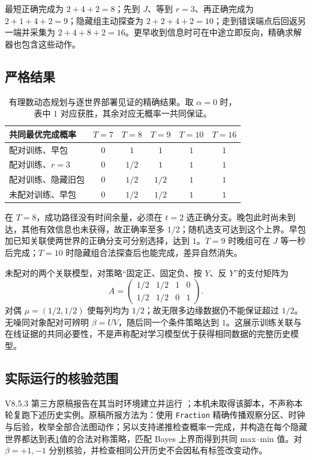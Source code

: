 \documentclass[11pt,a4paper,fontset=fandol]{ctexart}
\theoremstyle{definition}
\theoremstyle{remark}\newtheorem{remark}[theorem]{说明}
\numberwithin{equation}{section}
\begin{document}
最短正确完成为 $2+4+2=8$；先到 $J$、等到 $r=3$、再正确完成为 $2+1+4+2=9$；隐藏组主动探查为 $2+2+4+2=10$；走到错误端点后回返另一端并采集为 $2+4+8+2=16$。更早收到信息时可在中途立即反向，精确求解器也包含这些动作。

\subsection{严格结果}
\begin{table}[htbp]\centering\small
\begin{tabular}{lccccc}\toprule
共同最优完成概率 & $T=7$ & $T=8$ & $T=9$ & $T=10$ & $T=16$\\\midrule
配对训练、早包 & $0$ & $1$ & $1$ & $1$ & $1$\\
配对训练、$r=3$ & $0$ & $1/2$ & $1$ & $1$ & $1$\\
配对训练、隐藏旧包 & $0$ & $1/2$ & $1/2$ & $1$ & $1$\\
未配对训练、早包 & $0$ & $1/2$ & $1/2$ & $1$ & $1$\\\bottomrule
\end{tabular}
\caption{有理数动态规划与逐世界部署见证的精确结果。取 $\alpha=0$ 时，表中 $1$ 对应获胜，其余对应无概率一共同保证。}
\label{tab:graph}
\end{table}
在 $T=8$，成功路径没有时间余量，必须在 $t=2$ 选正确分支。晚包此时尚未到达，其他有效信息也未获得，故正确率至多 $1/2$；随机选支可达到这个上界。早包加已知关联使两世界的正确分支可分别选择，达到 $1$。$T=9$ 时晚组可在 $J$ 等一秒后完成；$T=10$ 时隐藏组合法探查后也能完成，差异自然消失。

未配对的两个关联模型，对策略“固定正、固定负、按 $Y$、反 $Y$”的支付矩阵为
\begin{equation}
 A=\begin{pmatrix}
 1/2&1/2&1&0\\
 1/2&1/2&0&1
 \end{pmatrix}.
 \label{eq:beta_matrix}
\end{equation}
对偶 $\mu=(1/2,1/2)$ 使每列均为 $1/2$；故无限多边缘数据仍不能保证超过 $1/2$。无噪同对象配对可辨明 $\beta=UV$，随后同一个条件策略达到 $1$。这展示训练关联与在线证据的共同必要性，不是声称配对学习模型优于获得相同数据的完整历史模型。

\subsection{实际运行的核验范围}
V8.5.3 第三方原稿报告在其当时环境建立并运行 ；本机未取得该脚本，不声称本轮复跑下述历史实例。原稿所报方法为：使用 \texttt{Fraction} 精确传播观察分区、时钟与后验，枚举全部合法图动作；另以支持递推检查概率一完成，并构造在每个隐藏世界都达到表\ref{tab:graph}值的合法对称策略，匹配 Bayes 上界而得到共同 max--min 值。对 $\beta=+1,-1$ 分别核验，并检查相同公开历史不会因私有标签改变动作。
\end{document}
